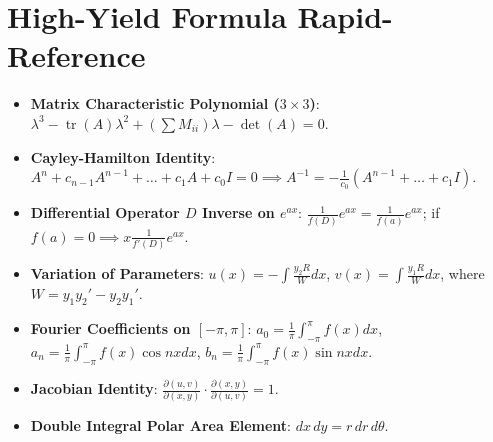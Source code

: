 \chapter*{High-Yield Formula Rapid-Reference}

\begin{itemize}[leftmargin=1.5em]
    \item \textbf{Matrix Characteristic Polynomial ($3 \times 3$)}: $\lambda^3 - \operatorname{tr}(A)\lambda^2 + (\sum M_{ii})\lambda - \det(A) = 0$.
    \item \textbf{Cayley-Hamilton Identity}: $A^n + c_{n-1}A^{n-1} + \dots + c_1 A + c_0 I = 0 \implies A^{-1} = -\frac{1}{c_0}(A^{n-1} + \dots + c_1 I)$.
    \item \textbf{Differential Operator $D$ Inverse on $e^{ax}$}: $\frac{1}{f(D)}e^{ax} = \frac{1}{f(a)}e^{ax}$; if $f(a) = 0 \implies x\frac{1}{f'(D)}e^{ax}$.
    \item \textbf{Variation of Parameters}: $u(x) = -\int \frac{y_2 R}{W} dx$, $v(x) = \int \frac{y_1 R}{W} dx$, where $W = y_1 y_2' - y_2 y_1'$.
    \item \textbf{Fourier Coefficients on $[-\pi, \pi]$}: $a_0 = \frac{1}{\pi}\int_{-\pi}^\pi f(x)dx$, $a_n = \frac{1}{\pi}\int_{-\pi}^\pi f(x)\cos nx dx$, $b_n = \frac{1}{\pi}\int_{-\pi}^\pi f(x)\sin nx dx$.
    \item \textbf{Jacobian Identity}: $\frac{\partial(u,v)}{\partial(x,y)} \cdot \frac{\partial(x,y)}{\partial(u,v)} = 1$.
    \item \textbf{Double Integral Polar Area Element}: $dx \, dy = r \, dr \, d\theta$.
\end{itemize}

\newpage

